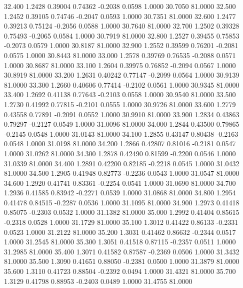   32.400   1.2428   0.39004   0.74362  -0.2038   0.0598   1.0000  30.7050  81.0000
  32.500   1.2452   0.39105   0.74746  -0.2047   0.0593   1.0000  30.7351  81.0000
  32.600   1.2477   0.39213   0.75124  -0.2056   0.0588   1.0000  30.7640  81.0000
  32.700   1.2502   0.39328   0.75493  -0.2065   0.0584   1.0000  30.7919  81.0000
  32.800   1.2527   0.39455   0.75853  -0.2073   0.0579   1.0000  30.8187  81.0000
  32.900   1.2552   0.39599   0.76201  -0.2081   0.0575   1.0000  30.8443  81.0000
  33.000   1.2578   0.39769   0.76535  -0.2088   0.0571   1.0000  30.8687  81.0000
  33.100   1.2604   0.39975   0.76852  -0.2094   0.0567   1.0000  30.8919  81.0000
  33.200   1.2631   0.40242   0.77147  -0.2099   0.0564   1.0000  30.9139  81.0000
  33.300   1.2660   0.40606   0.77414  -0.2102   0.0561   1.0000  30.9345  81.0000
  33.400   1.2692   0.41138   0.77643  -0.2103   0.0558   1.0000  30.9540  81.0000
  33.500   1.2730   0.41992   0.77815  -0.2101   0.0555   1.0000  30.9726  81.0000
  33.600   1.2779   0.43558   0.77891  -0.2091   0.0552   1.0000  30.9910  81.0000
  33.900   1.2834   0.43863   0.79297  -0.2127   0.0549   1.0000  31.0096  81.0000
  34.000   1.2844   0.43500   0.79865  -0.2145   0.0548   1.0000  31.0143  81.0000
  34.100   1.2855   0.43147   0.80438  -0.2163   0.0548   1.0000  31.0198  81.0000
  34.200   1.2866   0.42807   0.81016  -0.2181   0.0547   1.0000  31.0262  81.0000
  34.300   1.2878   0.42490   0.81599  -0.2200   0.0546   1.0000  31.0339  81.0000
  34.400   1.2891   0.42200   0.82185  -0.2218   0.0545   1.0000  31.0432  81.0000
  34.500   1.2905   0.41948   0.82773  -0.2236   0.0543   1.0000  31.0547  81.0000
  34.600   1.2920   0.41741   0.83361  -0.2254   0.0541   1.0000  31.0690  81.0000
  34.700   1.2936   0.41585   0.83942  -0.2271   0.0539   1.0000  31.0868  81.0000
  34.800   1.2954   0.41478   0.84515  -0.2287   0.0536   1.0000  31.1095  81.0000
  34.900   1.2973   0.41418   0.85075  -0.2303   0.0532   1.0000  31.1382  81.0000
  35.000   1.2992   0.41404   0.85615  -0.2318   0.0528   1.0000  31.1729  81.0000
  35.100   1.3012   0.41422   0.86133  -0.2331   0.0523   1.0000  31.2122  81.0000
  35.200   1.3031   0.41462   0.86632  -0.2344   0.0517   1.0000  31.2545  81.0000
  35.300   1.3051   0.41518   0.87115  -0.2357   0.0511   1.0000  31.2985  81.0000
  35.400   1.3071   0.41582   0.87587  -0.2369   0.0506   1.0000  31.3432  81.0000
  35.500   1.3090   0.41651   0.88050  -0.2381   0.0500   1.0000  31.3879  81.0000
  35.600   1.3110   0.41723   0.88504  -0.2392   0.0494   1.0000  31.4321  81.0000
  35.700   1.3129   0.41798   0.88953  -0.2403   0.0489   1.0000  31.4755  81.0000
